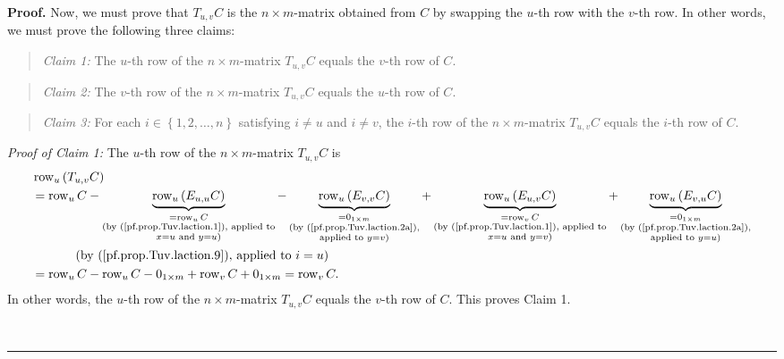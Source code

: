 \documentclass[numbers=enddot,12pt,final,onecolumn,notitlepage]{scrartcl}%
\theoremstyle{definition}
\newenvironment{statement}{\begin{quote}}{\end{quote}}
\newenvironment{proof}[1][Proof]{\noindent\textbf{#1.} }{\ \rule{0.5em}{0.5em}}
\begin{document}
\begin{proof}
Now, we must prove that $T_{u,v}C$ is the $n\times m$-matrix obtained from $C$
by swapping the $u$-th row with the $v$-th row. In other words, we must prove
the following three claims:

\begin{statement}
\textit{Claim 1:} The $u$-th row of the $n\times m$-matrix $T_{u,v}C$ equals
the $v$-th row of $C$.
\end{statement}

\begin{statement}
\textit{Claim 2:} The $v$-th row of the $n\times m$-matrix $T_{u,v}C$ equals
the $u$-th row of $C$.
\end{statement}

\begin{statement}
\textit{Claim 3:} For each $i\in\left\{  1,2,\ldots,n\right\}  $ satisfying
$i\neq u$ and $i\neq v$, the $i$-th row of the $n\times m$-matrix $T_{u,v}C$
equals the $i$-th row of $C$.
\end{statement}

\textit{Proof of Claim 1:} The $u$-th row of the $n\times m$-matrix $T_{u,v}C$
is%
\begin{align*}
&  \operatorname*{row}\nolimits_{u}\left(  T_{u,v}C\right) \\
&  =\operatorname*{row}\nolimits_{u}C-\underbrace{\operatorname*{row}%
\nolimits_{u}\left(  E_{u,u}C\right)  }_{\substack{=\operatorname*{row}%
\nolimits_{u}C\\\text{(by (\ref{pf.prop.Tuv.laction.1}), applied
to}\\x=u\text{ and }y=u\text{)}}}-\underbrace{\operatorname*{row}%
\nolimits_{u}\left(  E_{v,v}C\right)  }_{\substack{=0_{1\times m}\\\text{(by
(\ref{pf.prop.Tuv.laction.2a}),}\\\text{applied to }y=v\text{)}}%
}+\underbrace{\operatorname*{row}\nolimits_{u}\left(  E_{u,v}C\right)
}_{\substack{=\operatorname*{row}\nolimits_{v}C\\\text{(by
(\ref{pf.prop.Tuv.laction.1}), applied to}\\x=u\text{ and }y=v\text{)}%
}}+\underbrace{\operatorname*{row}\nolimits_{u}\left(  E_{v,u}C\right)
}_{\substack{=0_{1\times m}\\\text{(by (\ref{pf.prop.Tuv.laction.2a}%
),}\\\text{applied to }y=u\text{)}}}\\
&  \ \ \ \ \ \ \ \ \ \ \left(  \text{by (\ref{pf.prop.Tuv.laction.9}), applied
to }i=u\right) \\
&  =\operatorname*{row}\nolimits_{u}C-\operatorname*{row}\nolimits_{u}%
C-0_{1\times m}+\operatorname*{row}\nolimits_{v}C+0_{1\times m}%
=\operatorname*{row}\nolimits_{v}C.
\end{align*}
In other words, the $u$-th row of the $n\times m$-matrix $T_{u,v}C$ equals the
$v$-th row of $C$. This proves Claim 1.


\end{proof}
\end{document}
